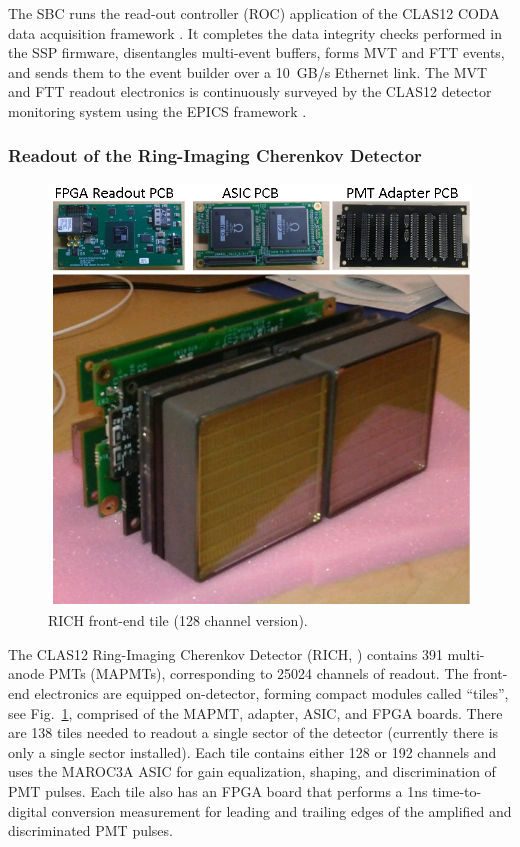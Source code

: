 The SBC runs the read-out controller (ROC) application of the CLAS12 CODA data acquisition framework \cite{coda-ref}. It completes the data integrity checks performed in the SSP firmware, disentangles multi-event buffers, forms MVT and FTT events, and sends them to the event builder over a 10~GB/s Ethernet link. The MVT and FTT readout electronics is continuously surveyed by the CLAS12 detector monitoring system using the EPICS framework \cite{epics-website}.

\subsubsection{Readout of the Ring-Imaging Cherenkov Detector}

\begin{figure}[hbt]
	\centering
	\includegraphics[width=1.0\columnwidth,keepaspectratio]{img/rich_tile_128ch.png}
	\caption{RICH front-end tile (128 channel version).}
	\label{fig:rich1}
\end{figure}

The CLAS12 Ring-Imaging Cherenkov Detector (RICH, \cite{rich-ref}) contains 391 multi-anode PMTs (MAPMTs), corresponding to 25024 channels of readout. The front-end electronics are equipped on-detector, forming compact modules called ``tiles'', see Fig.~\ref{fig:rich1}, comprised of the MAPMT, adapter, ASIC, and FPGA boards. There are 138 tiles needed to readout a single sector of the detector (currently there is only a single sector installed). Each tile contains either 128 or 192 channels and uses the MAROC3A ASIC for gain equalization, shaping, and discrimination of PMT pulses. Each tile also has an FPGA board that performs a 1ns time-to-digital conversion measurement for leading and trailing edges of the amplified and discriminated PMT pulses.

